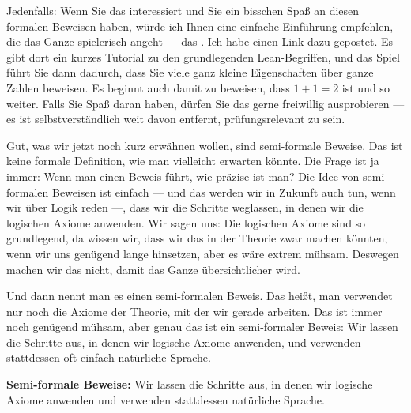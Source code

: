 \begin{spoken-clean}[00:16:30 - 00:19:44]
Jedenfalls: Wenn Sie das interessiert und Sie ein bisschen Spaß an diesen formalen Beweisen haben, würde ich Ihnen eine einfache Einführung empfehlen, die das Ganze spielerisch angeht --- das . Ich habe einen Link dazu gepostet. Es gibt dort ein kurzes Tutorial zu den grundlegenden Lean-Begriffen, und das Spiel führt Sie dann dadurch, dass Sie viele ganz kleine Eigenschaften über ganze Zahlen beweisen. Es beginnt auch damit zu beweisen, dass $1 + 1 = 2$ ist und so weiter. Falls Sie Spaß daran haben, dürfen Sie das gerne freiwillig ausprobieren --- es ist selbstverständlich weit davon entfernt, prüfungsrelevant zu sein.
\end{spoken-clean}

\begin{spoken-clean}[00:19:44 - 00:21:23]
Gut, was wir jetzt noch kurz erwähnen wollen, sind semi-formale Beweise. Das ist keine formale Definition, wie man vielleicht erwarten könnte. Die Frage ist ja immer: Wenn man einen Beweis führt, wie präzise ist man? Die Idee von semi-formalen Beweisen ist einfach --- und das werden wir in Zukunft auch tun, wenn wir über Logik reden ---, dass wir die Schritte weglassen, in denen wir die logischen Axiome anwenden. Wir sagen uns: Die logischen Axiome sind so grundlegend, da wissen wir, dass wir das in der Theorie zwar machen könnten, wenn wir uns genügend lange hinsetzen, aber es wäre extrem mühsam. Deswegen machen wir das nicht, damit das Ganze übersichtlicher wird.

Und dann nennt man es einen semi-formalen Beweis. Das heißt, man verwendet nur noch die Axiome der Theorie, mit der wir gerade arbeiten. Das ist immer noch genügend mühsam, aber genau das ist ein semi-formaler Beweis: Wir lassen die Schritte aus, in denen wir logische Axiome anwenden, und verwenden stattdessen oft einfach natürliche Sprache.
\end{spoken-clean}

\begin{math-stroke}
\textbf{Semi-formale Beweise:}
Wir lassen die Schritte aus, in denen wir logische Axiome anwenden und verwenden stattdessen natürliche Sprache.
\end{math-stroke}

